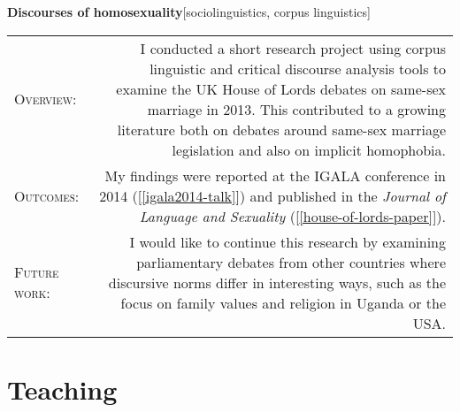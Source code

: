 \documentclass[11pt,a4paper]{article}
\makeatletter
\newlength{\rulelength}%
\newcommand{\REx}[2]{%
\vspace*{0.1\baselineskip}%
{\large\textbf{#1}\hfill\textnormal{[#2]}}%
\vspace*{0.5\baselineskip}%
}
\newenvironment{cvsection}{%
  \setlength{\extrarowheight}{0.70ex}
  \begin{longtable}[l]{@{} L R @{}}
}{%
  \end{longtable}
}
\newcommand{\sref}[1]{[\ref{#1}]}
\newcommand{\subhead}[1]{%
\textsc{#1}:%
}
\makeatother
\begin{document}
\REx{Discourses of homosexuality}{sociolinguistics, corpus linguistics}
\begin{cvsection}
  \subhead{Overview} &%
  I conducted a short research project using corpus linguistic and critical discourse analysis tools to examine the UK House of Lords debates on same-sex marriage in 2013. This contributed to a growing literature both on debates around same-sex marriage legislation and also on implicit homophobia.%
\\
  \subhead{Outcomes} &%
  My findings were reported at the IGALA conference in 2014 (\sref{igala2014-talk}) and published in the \textit{Journal of Language and Sexuality} (\sref{house-of-lords-paper}).%
\\
  \subhead{Future work} &%
  I would like to continue this research by examining parliamentary debates from other countries where discursive norms differ in interesting ways, such as the focus on family values and religion in Uganda or the USA.
\end{cvsection}


\newpage

\section*{Teaching}
\end{document}
